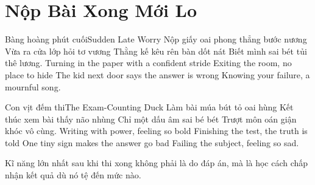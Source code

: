 \chapter{Nộp Bài Xong Mới Lo}

\begin{tutuyetbox}{Bàng hoàng phút cuối}{Sudden Late Worry}
Nộp giấy oai phong thẳng bước nương
Vừa ra cửa lớp hỏi tơ vương
Thằng kế kêu rên bàn dốt nát
Biết mình sai bét tủi thê lương.
\tcblower
Turning in the paper with a confident stride 
Exiting the room, no place to hide 
The kid next door says the answer is wrong 
Knowing your failure, a mournful song.
\end{tutuyetbox}

\begin{tutuyetbox}{Con vịt đếm thi}{The Exam-Counting Duck}
Làm bài múa bút tỏ oai hùng
Kết thúc xem bài thấy não nhùng
Chỉ một dấu âm sai bé bét
Trượt môn oán giận khóc vô cùng.
\tcblower
Writing with power, feeling so bold 
Finishing the test, the truth is told 
One tiny sign makes the answer go bad 
Failing the subject, feeling so sad.
\end{tutuyetbox}

\begin{ghichu}
Kĩ năng lớn nhất sau khi thi xong không phải là do đáp án, mà là học cách chấp nhận kết quả dù nó tệ đến mức nào.
\end{ghichu}